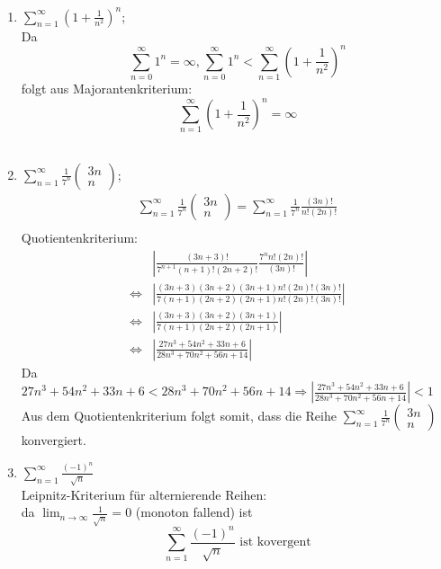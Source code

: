 \documentclass{HM}
\begin{document}
\begin{enumerate}
\begin{enumerate}
\item $\sum\limits_{n=1}^\infty(1+\frac{1}{n^2})^n$;\\
Da $$\sum\limits_{n=0}^\infty 1^n = \infty, \sum\limits_{n=0}^\infty 1^n < \sum\limits_{n=1}^\infty(1+\frac{1}{n^2})^n$$
folgt aus Majorantenkriterium: \\
$$\sum\limits_{n=1}^\infty(1+\frac{1}{n^2})^n = \infty$$
\\
\item $\sum\limits_{n=1}^\infty\frac{1}{7^n}\begin{pmatrix}
3n\\
n
\end{pmatrix}$;\\
\begin{align*}
	\sum\limits_{n=1}^\infty\frac{1}{7^n}
	\begin{pmatrix}
		3n\\
		n
	\end{pmatrix}
	=\sum\limits_{n=1}^\infty\frac{1}{7^n} \frac{(3n)!}{n!(2n)!}\\
\end{align*}
Quotientenkriterium:
\begin{align*}
	&\left|\frac{(3n+3)!}{7^{n+1}(n+1)!(2n+2)!}\frac{7^nn!(2n)!}{(3n)!}\right|\\
	\Leftrightarrow &\left|\frac{(3n+3)(3n+2)(3n+1)n!(2n)!(3n)!}{7(n+1)(2n+2)(2n+1)n!(2n)!(3n)!}\right|\\
	\Leftrightarrow &\left|\frac{(3n+3)(3n+2)(3n+1)}{7(n+1)(2n+2)(2n+1)}\right|\\
	\Leftrightarrow &\left|\frac{27n^3+54n^2+33n+6}{28n^3+70n^2+56n+14}\right|
	\end{align*}
	Da $27n^3+54n^2+33n+6<28n^3+70n^2+56n+14 \Rightarrow \left|\frac{27n^3+54n^2+33n+6}{28n^3+70n^2+56n+14}\right|<1$
\\
Aus dem Quotientenkriterium folgt somit, dass die Reihe $\sum\limits_{n=1}^\infty\frac{1}{7^n}\begin{pmatrix}
3n\\
n
\end{pmatrix}$ konvergiert.
\item $\sum\limits_{n=1}^\infty\frac{(-1)^n}{\sqrt{n}}$\\
Leipnitz-Kriterium für alternierende Reihen:\\
da $\lim_{n\to\infty} \frac{1}{\sqrt{n}} = 0$ (monoton fallend) ist $$\sum\limits_{n=1}^\infty\frac{(-1)^n}{\sqrt{n}}\text{ ist kovergent}$$ 

\end{enumerate}

\end{enumerate}
\end{document}
